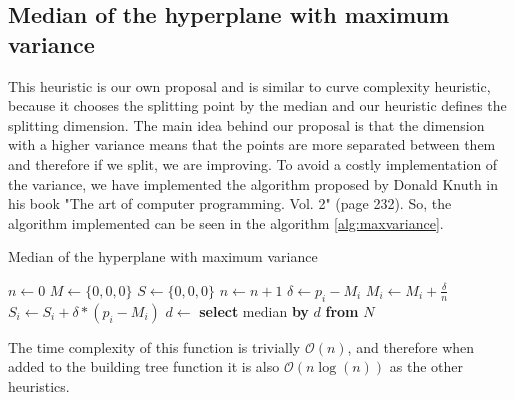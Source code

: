 \subsection{Median of the hyperplane with maximum variance}
This heuristic is our own proposal and is similar to curve complexity heuristic, because it chooses the splitting point by the median and our heuristic defines the splitting dimension. The main idea behind our proposal is that the dimension with a higher variance means that the points are more separated between them and therefore if we split, we are improving. To avoid a costly implementation of the variance, we have implemented the algorithm proposed by Donald Knuth in his book "The art of computer programming. Vol. 2" \cite{knuth97} (page 232). So, the algorithm implemented can be seen in the algorithm \ref{alg:maxvariance}.
\begin{algorithm}[h!]
    \caption{Median of the hyperplane with maximum variance
        \label{alg:maxvariance}}
    \begin{algorithmic}[1]
    \Statex
        \State $n \gets 0$
        \State $M \gets \{0,0,0\}$
        \State $S \gets \{0,0,0\}$
            \State $n \gets n + 1$
                \State $\delta \gets p_i - M_i$
                \State $M_i \gets M_i + \frac{\delta}{n}$
                \State $S_i \gets S_i + \delta*(p_i - M_i)$
            \EndFor
        \EndFor
        \State $d \gets $  
        \State \textbf{select} median \textbf{by} $d$ \textbf{from} $N$
        \State {}
    \EndFunction
    \end{algorithmic}
\end{algorithm}

The time complexity of this function is trivially $\mathcal{O}(n)$, and therefore when added to the building tree function it is also $\mathcal{O}(n\log{}(n))$ as the other heuristics.
\pagebreak

